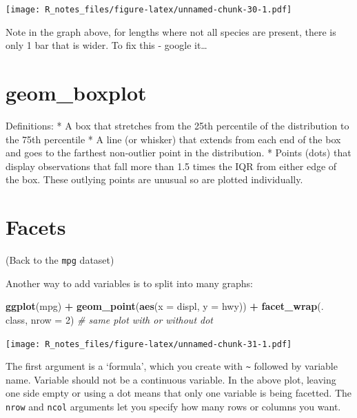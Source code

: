 \documentclass[]{book}
\newenvironment{Shaded}{\begin{snugshade}}{\end{snugshade}}
\newcommand{\KeywordTok}[1]{\textcolor[rgb]{0.13,0.29,0.53}{\textbf{#1}}}
\newcommand{\DataTypeTok}[1]{\textcolor[rgb]{0.13,0.29,0.53}{#1}}
\newcommand{\DecValTok}[1]{\textcolor[rgb]{0.00,0.00,0.81}{#1}}
\newcommand{\StringTok}[1]{\textcolor[rgb]{0.31,0.60,0.02}{#1}}
\newcommand{\CommentTok}[1]{\textcolor[rgb]{0.56,0.35,0.01}{\textit{#1}}}
\newcommand{\OperatorTok}[1]{\textcolor[rgb]{0.81,0.36,0.00}{\textbf{#1}}}
\newcommand{\NormalTok}[1]{#1}
\begin{document}
\texttt{[image: R\_notes\_files/figure-latex/unnamed-chunk-30-1.pdf]}

Note in the graph above, for lengths where not all species are present,
there is only 1 bar that is wider. To fix this - google it\ldots{}

\section{geom\_boxplot}\label{geom_boxplot}

Definitions: * A box that stretches from the 25th percentile of the
distribution to the 75th percentile * A line (or whisker) that extends
from each end of the box and goes to the farthest non-outlier point in
the distribution. * Points (dots) that display observations that fall
more than 1.5 times the IQR from either edge of the box. These outlying
points are unusual so are plotted individually.

\section{Facets}\label{facets}

(Back to the \texttt{mpg} dataset)

Another way to add variables is to split into many graphs:

\begin{Shaded}
\begin{Highlighting}[]
\KeywordTok{ggplot}\NormalTok{(mpg) }\OperatorTok{+}\StringTok{ }
\StringTok{  }\KeywordTok{geom_point}\NormalTok{(}\KeywordTok{aes}\NormalTok{(}\DataTypeTok{x =}\NormalTok{ displ, }\DataTypeTok{y =}\NormalTok{ hwy)) }\OperatorTok{+}\StringTok{ }
\StringTok{  }\KeywordTok{facet_wrap}\NormalTok{(. }\OperatorTok{~}\StringTok{ }\NormalTok{class, }\DataTypeTok{nrow =} \DecValTok{2}\NormalTok{) }\CommentTok{# same plot with or without dot}
\end{Highlighting}
\end{Shaded}

\texttt{[image: R\_notes\_files/figure-latex/unnamed-chunk-31-1.pdf]}

The first argument is a `formula', which you create with
\texttt{\textasciitilde{}} followed by variable name. Variable should
not be a continuous variable. In the above plot, leaving one side empty
or using a dot means that only one variable is being facetted. The
\texttt{nrow} and \texttt{ncol} arguments let you specify how many rows
or columns you want.
\end{document}
